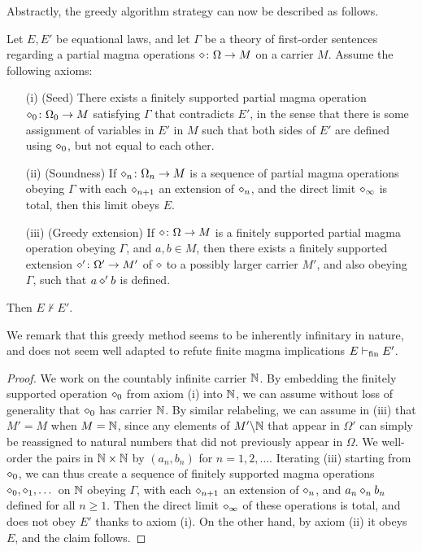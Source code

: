 Abstractly, the greedy algorithm strategy can now be described as follows.

\begin{theorem}\label{greedy-abstract} Let $E,E'$ be equational laws, and let $\Gamma$ be a theory of first-order sentences regarding a  partial magma operations $\diamond \colon \Omega \to M$ on a carrier $M$.  Assume the following axioms:
\begin{itemize}
  \item[(i)] (Seed) There exists a finitely supported partial magma operation $\diamond_0 \colon \Omega_0 \to M$ satisfying $\Gamma$ that contradicts $E'$, in the sense that there is some assignment of variables in $E'$ in $M$ such that both sides of $E'$ are defined using $\diamond_0$, but not equal to each other.
  \item[(ii)]  (Soundness)  If $\diamond_n \colon \Omega_n \to M$ is a sequence of partial magma operations obeying $\Gamma$ with each $\diamond_{n+1}$ an extension of $\diamond_n$, and the direct limit $\diamond_\infty$ is total, then this limit obeys $E$.
  \item[(iii)] (Greedy extension)  If $\diamond \colon \Omega \to M$ is a finitely supported partial magma operation obeying $\Gamma$, and $a,b \in M$, then there exists a finitely supported extension $\diamond' \colon \Omega' \to M'$ of $\diamond$ to a possibly larger carrier $M'$, and also obeying $\Gamma$, such that $a \diamond' b$ is defined.
\end{itemize}
Then $E \not \vdash E'$.
\end{theorem}

We remark that this greedy method seems to be inherently infinitary in nature, and does not seem well adapted to refute finite magma implications $E \vdash_{\mathrm{fin}} E'$.

\begin{proof}  We work on the countably infinite carrier $\mathbb{N}$.  By embedding the finitely supported operation $\diamond_0$ from axiom (i) into $\mathbb{N}$, we can assume without loss of generality that $\diamond_0$ has carrier $\mathbb{N}$.  By similar relabeling, we can assume in (iii) that $M' = M$ when $M=\mathbb{N}$, since any elements of $M' \backslash \mathbb{N}$ that
appear in $\Omega'$ can simply be reassigned to natural numbers that did not previously appear in $\Omega$.  We well-order the pairs in $\mathbb{N} \times \mathbb{N}$ by $(a_n,b_n)$ for $n=1,2,\dots$.  Iterating (iii) starting from $\diamond_0$, we can thus create a sequence of finitely supported magma operations $\diamond_0, \diamond_1, \dots$ on $\mathbb{N}$ obeying $\Gamma$, with each $\diamond_{n+1}$ an extension of $\diamond_n$, and $a_n \diamond_n b_n$ defined for all $n \geq 1$.  Then the direct limit $\diamond_\infty$ of these operations is total, and does not obey $E'$ thanks to axiom (i).  On the other hand, by axiom (ii) it obeys $E$, and the claim follows.
\end{proof}

